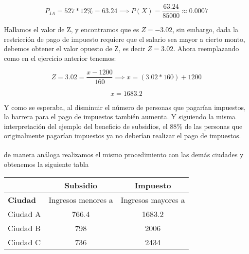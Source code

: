 \documentclass{article}
\begin{document}
$$P_{IA} = 527 * 12\% = 63.24 \implies P(X) = \frac{63.24}{85000} \approx 0.0007 $$

Hallamos el valor de Z, y encontramos que es $Z = -3.02$, sin embargo, dada la restricción de pago de impuesto requiere que el salario sea mayor a cierto monto, debemos obtener el valor opuesto de Z, es decir $Z = 3.02$. Ahora reemplazando como en el ejercicio anterior tenemos:

$$Z = 3.02 = \frac{x-1200}{160} \implies x = (3.02*160) + 1200$$

$$x = 1683.2$$

Y como se esperaba, al disminuir el número de personas que pagarían impuestos, la barrera para el pago de impuestos también aumenta. Y siguiendo la misma interpretación del ejemplo del beneficio de subsidios, el 88\% de las personas que originalmente pagarían impuestos ya no deberían realizar el pago de impuestos.

\paragraph{} de manera análoga realizamos el mismo procedimiento con las demás ciudades y obtenemos la siguiente tabla

\begin{center}
	\begin{tabular}{ | l | c | c | }
		\hline
		\space & \textbf{Subsidio} & \textbf{Impuesto} \\
		\hline
		\textbf{Ciudad} & Ingresos menores a & Ingresos mayores a \\
		\hline
		Ciudad A & 766.4 & 1683.2 \\
		\hline
		Ciudad B & 798 & 2006 \\
		\hline
		Ciudad C & 736 & 2434 \\
		\hline
	\end{tabular}
\end{center}
\end{document}
